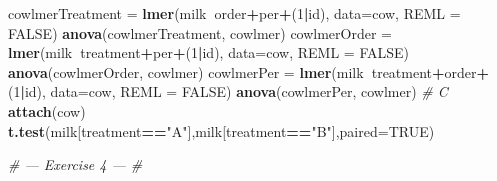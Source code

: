 \documentclass[]{article}
\newenvironment{Shaded}{\begin{snugshade}}{\end{snugshade}}
\newcommand{\CommentTok}[1]{\textcolor[rgb]{0.56,0.35,0.01}{\textit{#1}}}
\newcommand{\DataTypeTok}[1]{\textcolor[rgb]{0.13,0.29,0.53}{#1}}
\newcommand{\DecValTok}[1]{\textcolor[rgb]{0.00,0.00,0.81}{#1}}
\newcommand{\KeywordTok}[1]{\textcolor[rgb]{0.13,0.29,0.53}{\textbf{#1}}}
\newcommand{\NormalTok}[1]{#1}
\newcommand{\OperatorTok}[1]{\textcolor[rgb]{0.81,0.36,0.00}{\textbf{#1}}}
\newcommand{\OtherTok}[1]{\textcolor[rgb]{0.56,0.35,0.01}{#1}}
\newcommand{\StringTok}[1]{\textcolor[rgb]{0.31,0.60,0.02}{#1}}
\begin{document}
\begin{Shaded}
\begin{Highlighting}[]
\NormalTok{cowlmerTreatment =}\StringTok{ }\KeywordTok{lmer}\NormalTok{(milk}\OperatorTok{~}\NormalTok{order}\OperatorTok{+}\NormalTok{per}\OperatorTok{+}\NormalTok{(}\DecValTok{1}\OperatorTok{|}\NormalTok{id), }\DataTypeTok{data=}\NormalTok{cow, }\DataTypeTok{REML =} \OtherTok{FALSE}\NormalTok{)}
\KeywordTok{anova}\NormalTok{(cowlmerTreatment, cowlmer)}
\NormalTok{cowlmerOrder =}\StringTok{ }\KeywordTok{lmer}\NormalTok{(milk}\OperatorTok{~}\NormalTok{treatment}\OperatorTok{+}\NormalTok{per}\OperatorTok{+}\NormalTok{(}\DecValTok{1}\OperatorTok{|}\NormalTok{id), }\DataTypeTok{data=}\NormalTok{cow, }\DataTypeTok{REML =} \OtherTok{FALSE}\NormalTok{)}
\KeywordTok{anova}\NormalTok{(cowlmerOrder, cowlmer)}
\NormalTok{cowlmerPer =}\StringTok{ }\KeywordTok{lmer}\NormalTok{(milk}\OperatorTok{~}\NormalTok{treatment}\OperatorTok{+}\NormalTok{order}\OperatorTok{+}\NormalTok{(}\DecValTok{1}\OperatorTok{|}\NormalTok{id), }\DataTypeTok{data=}\NormalTok{cow, }\DataTypeTok{REML =} \OtherTok{FALSE}\NormalTok{)}
\KeywordTok{anova}\NormalTok{(cowlmerPer, cowlmer)}
\CommentTok{# C}
\KeywordTok{attach}\NormalTok{(cow)}
\KeywordTok{t.test}\NormalTok{(milk[treatment}\OperatorTok{==}\StringTok{"A"}\NormalTok{],milk[treatment}\OperatorTok{==}\StringTok{"B"}\NormalTok{],}\DataTypeTok{paired=}\OtherTok{TRUE}\NormalTok{)}

\CommentTok{# --- Exercise 4 --- #}


\end{Highlighting}
\end{Shaded}
\end{document}
